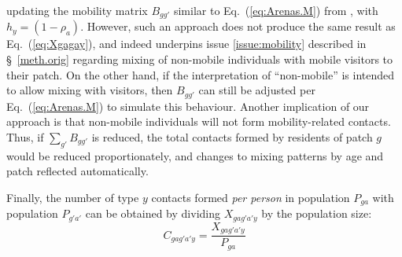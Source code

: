 updating the mobility matrix $B_{gg'}$ similar to Eq.~(\ref{eq:Arenas.M}) from \cite{Arenas2020},
with $h_y = (1-\rho_a)$.
However, such an approach does not produce the same result as Eq.~(\ref{eq:Xgagay}),
and indeed underpins issue \ref{issue:mobility} described in \S~\ref{meth.orig}
regarding mixing of non-mobile individuals with mobile visitors to their patch.
On the other hand, if the interpretation of ``non-mobile'' is intended to allow mixing with visitors,
then $B_{gg'}$ can still be adjusted per Eq.~(\ref{eq:Arenas.M}) to simulate this behaviour.
Another implication of our approach is that
non-mobile individuals will not form mobility-related contacts.
Thus, if $\sum_{g'} B_{gg'}$ is reduced,
the total contacts formed by residents of patch $g$ would be reduced proportionately,
and changes to mixing patterns by age and patch reflected automatically.
\par
Finally, the number of type $y$ contacts formed \textit{per person}
in population $P_{ga}$ with population $P_{g'a'}$ can be obtained by
dividing $X_{gag'a'y}$ by the population size:
\begin{equation}\label{eq:Cgagay}
  C_{gag'a'y} = \frac{X_{gag'a'y}}{P_{ga}}
\end{equation}